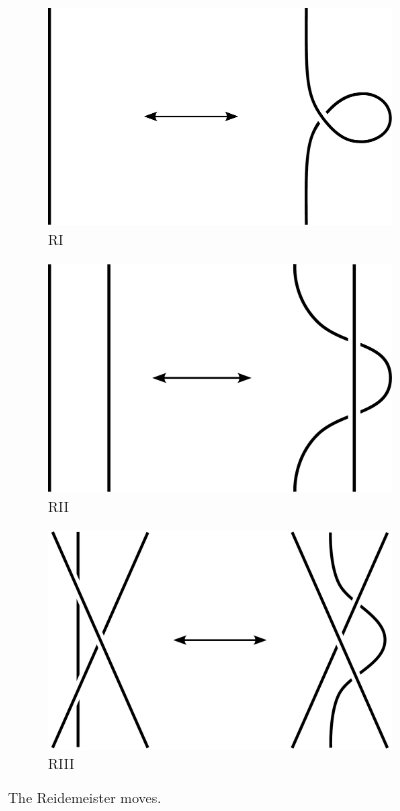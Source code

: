 \documentclass[12pt]{report}
\begin{document}
\begin{figure}[H]
	\centering
	\hfill
	\begin{subfigure}[b]{0.3 \textwidth}
		\centering
		\includegraphics[width=0.7\linewidth]{graphics/reidemeister_1}
		\caption{RI}
	\end{subfigure}
	\hfill
	\begin{subfigure}[b]{0.3 \textwidth}
		\centering
		\includegraphics[width=0.7\linewidth]{graphics/reidemeister_2}
		\caption{RII}
	\end{subfigure}
	\hfill
	\begin{subfigure}[b]{0.3 \textwidth}
		\centering
		\includegraphics[width=0.7\linewidth]{graphics/reidemeister_3}
		\caption{RIII}
	\end{subfigure}
	\caption{The Reidemeister moves.}
	\label{fig:reidemeister_moves}
	\hfill \phantom{1}
\end{figure}
\end{document}
